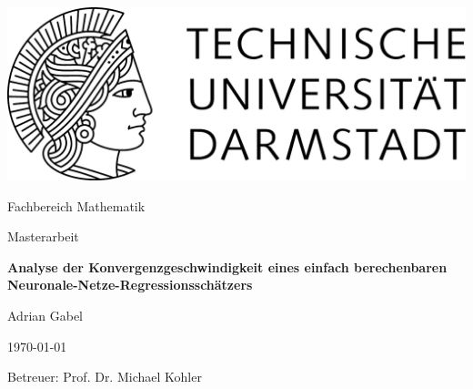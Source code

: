 \begin{titlepage}
  \begin{center}
    \vspace{1cm}
    \includegraphics[width=0.5\linewidth]{TU_Darmstadt_Logo.pdf}
    \vspace{1cm}
    
    \large{Fachbereich Mathematik}
    \vspace{2.5cm}
    
    \large{Masterarbeit}
    \vspace{2cm}

    \Large{\textbf{Analyse der Konvergenzgeschwindigkeit eines einfach berechenbaren Neuronale-Netze-Regressionsschätzers}}
    
    \vspace*{3cm}    
    
		\large
                Adrian Gabel
    \vspace*{1.0cm}

    \today \\
    \vspace*{2cm}

    Betreuer: Prof. Dr. Michael Kohler

    \vspace*{.5cm}

    \vspace*{\fill}
  \end{center}
\end{titlepage}
\vspace*{\fill}
